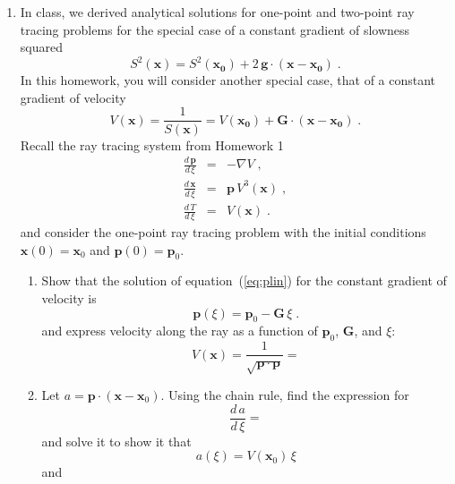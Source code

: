 \begin{enumerate}
\item In class, we derived analytical solutions for one-point and
two-point ray tracing problems for the special case of a constant
gradient of slowness squared 
\begin{equation}
  \label{eq:s2}
  S^2(\mathbf{x}) =
  S^2(\mathbf{x_0})+2\,\mathbf{g} \cdot (\mathbf{x}-\mathbf{x_0})\;.
\end{equation}
In this homework, you will consider another special case, that of a
constant gradient of velocity
\begin{equation}
  V(\mathbf{x}) = \frac{1}{S(\mathbf{x})} =
  {V(\mathbf{x_0})+\mathbf{G} \cdot (\mathbf{x}-\mathbf{x_0})}\;.
  \label{eq:v}
\end{equation}
Recall the ray tracing system from Homework 1
\begin{eqnarray}
  \label{eq:plin}
  \frac{d\,\mathbf{p}}{d\,\xi} & = & -\nabla V\;, \\
  \label{eq:xlin}
  \frac{d\,\mathbf{x}}{d\,\xi} & = &
  \mathbf{p}\,V^3(\mathbf{x})\;, \\
  \label{eq:tlin}
  \frac{d\,T}{d\,\xi} & = & V(\mathbf{x})\;.
\end{eqnarray}
and consider the one-point ray tracing problem with the initial conditions
$\mathbf{x}(0)= \mathbf{x}_0$ and $\mathbf{p}(0)=\mathbf{p}_0$.
\begin{enumerate}
\item  Show that the solution of
equation~(\ref{eq:plin}) for the constant gradient of velocity is
\begin{equation}
  \label{eq:pcir}
  \mathbf{p}(\xi) =  \mathbf{p}_0 - \mathbf{G}\,\xi\;.
\end{equation}
and express velocity along the ray as a function of
  $\mathbf{p}_0$, $\mathbf{G}$, and $\xi$:
  \begin{equation}
\label{eq:vsol}
V(\mathbf{x}) = \frac{1}{\sqrt{\mathbf{p} \cdot \mathbf{p}}} = 
\end{equation}
\item Let $a = \mathbf{p} \cdot (\mathbf{x} - \mathbf{x}_0)$. Using
  the chain rule, find the expression for
  \begin{equation}
    \frac{d\,a}{d\,\xi} = 
  \end{equation}
  and solve it to show it that 
  \begin{equation}
    \label{eq:asol}
    a(\xi) = V(\mathbf{x}_0)\,\xi
  \end{equation}
  and
  \begin{equation}

\end{equation}
\end{enumerate}
\end{enumerate}
